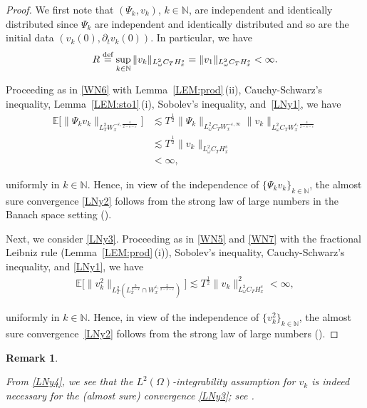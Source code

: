 \documentclass[letterpaper, 11pt,  reqno]{amsart}
\newtheorem{remark}[theorem]{Remark}
\newcommand{\1}{\hspace{0.5mm}\text{I}\hspace{0.2mm}}
\newcommand{\noi}{\noindent}
\newcommand{\N}{\mathbb{N}}
\newcommand{\E}{\mathbb{E}}
\newcommand{\eps}{\varepsilon}
\newcommand{\dt}{\partial_t}
\newcommand{\les}{\lesssim}
\newcommand{\deff}{\stackrel{\textup{def}}{=}}
\renewcommand{\O}{\Omega}
\renewcommand{\o}{\omega}
\numberwithin{equation}{section}
\numberwithin{theorem}{section}
\begin{document}
\begin{proof} 
We first note that 
$(\Psi_k, v_k)$, $k \in \N$,  are independent 
and identically distributed
since
$\Psi_k$ are independent
 and identically distributed 
and so are
the initial data
$(v_k(0), \dt v_k(0))$.
In particular, we have
\begin{align}
R\deff 
\sup_{k \in \N} 
\| v_k \|_{L^2_\o C_T H^s_x}
= 
\| v_1 \|_{L^2_\o C_T H^s_x}
 < \infty.
\label{LNy1}
\end{align}


Proceeding as in \eqref{WN6} with 
  Lemma~\ref{LEM:prod}\,(ii), 
Cauchy-Schwarz's inequality,  Lemma~\ref{LEM:sto1}\,(i), 
Sobolev's inequality, 
and~\eqref{LNy1}, we have
\begin{align*}
 \E \Big[ \| \Psi_k v_k \|_{L_T^2 W^{-\eps, \frac 4{2- s - \eps}}_x}  \Big] 
 &\les T^\frac 12  \| \Psi_k \|_{L^2_\o C_T W_x^{- \eps, \infty}}
  \| v_k \|_{L^2_\o C_T  W_x^{\eps, \frac4 {2-s-\eps}}}\\
&\les T^\frac 12 
  \| v_k \|_{L^2_\o C_T  H^s_x}\\
&< \infty, 
\end{align*}

\noi
uniformly in $k \in \N$.
Hence, in view of the  independence of $\{\Psi_k v_k\}_{k \in \N}$, 
the almost sure convergence
\eqref{LNy2} follows from the strong law of large numbers 
in the Banach space setting
(\cite[Corollary~7.10 on p.\,189]{LT}).

Next, we consider  \eqref{LNy3}. 
Proceeding as in \eqref{WN5} and \eqref{WN7} with 
the fractional Leibniz rule (Lemma~\ref{LEM:prod}\,(i)), 
Sobolev's inequality, Cauchy-Schwarz's inequality, 
and  \eqref{LNy1}, we have
\begin{align}
\E \Big[ \| v_k^2 \|_{L_T^2 (L^\frac 3{2-s}_x
\cap W_x^{\eps, \frac 2{2-s-\eps}})} \Big] 
 \les T^\frac 12 \| v_k \|^2_{L^2_\o C_T H_x^{s}} < \infty, 
\label{LNy4}
\end{align}

\noi
uniformly in $k \in \N$.
Hence, in view of the  independence of $\{v_k^2\}_{k \in \N}$, 
the almost sure convergence~\eqref{LNy2} follows from the strong law of large numbers (\cite[Corollary~7.10 on p.\,189]{LT}).
\end{proof}






\begin{remark}\label{REM:high0}
\rm 

From \eqref{LNy4}, we see that 
the $L^2(\O)$-integrability assumption
for $v_k$
is indeed necessary 
for the (almost sure) convergence \eqref{LNy3};
see \cite[Corollary~7.10 on p.\,189]{LT}.

\smallskip


\end{remark}
\end{document}
